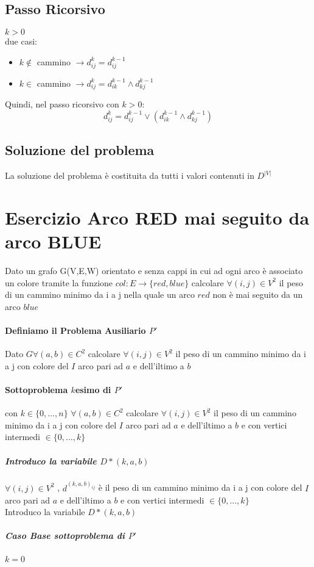 \documentclass[12pt, a4paper, openany]{book}
\begin{document}
    \subsection*{Passo Ricorsivo} $k>0$\\
    due casi:
    \begin{itemize}
        \item $k\notin$ cammino $\rightarrow d^k_{ij} = d^{k-1}_{ij}$
        \item $k \in$ cammino $\rightarrow d^k_{ij} = d^{k-1}_{ik} \land d^{k-1}_{kj}$
    \end{itemize}
    Quindi, nel passo ricorsivo con $k>0$:
    \begin{equation*}
        d^k_{ij} = d^{k-1}_{ij} \lor  (d^{k-1}_{ik} \land d^{k-1}_{kj})
    \end{equation*}

    \subsection*{Soluzione del problema}
    La soluzione del problema è costituita da tutti i valori contenuti in $D^{|V|}$

    \section{Esercizio Arco RED mai seguito da arco BLUE}
    Dato un grafo G(V,E,W) orientato e senza cappi in cui ad ogni arco è associato un colore tramite la funzione $col: E\rightarrow \{red,blue\}$
    calcolare $\forall (i,j) \in V^2$ il peso di un cammino minimo da i a j nella quale un arco $red$ non è mai seguito da un arco $blue$

    \paragraph{Definiamo il Problema Ausiliario $P'$}
    Dato $G \forall(a,b) \in C^2$ calcolare $\forall(i,j) \in V^2$ il peso di un cammino minimo da i a j con
    colore del $I$ arco pari ad $a$ e dell'iltimo a $b$

    \paragraph{Sottoproblema $k$esimo di $P'$} con $k \in \{0,...,n\}$
$\forall(a,b) \in C^2$ calcolare $\forall(i,j) \in V^2$ il peso di un cammino minimo da i a j con
    colore del $I$ arco pari ad $a$ e dell'iltimo a $b$ e con vertici intermedi $\in \{0,...,k\}$\\
    \subparagraph{Introduco la variabile $D*{(k,a,b)}$}
$\forall(i,j)\in V^2$ , $d^{(k,a,b)_{ij}}$ è il peso di un cammino minimo da i a j  con
    colore del $I$ arco pari ad $a$ e dell'iltimo a $b$ e con vertici intermedi $\in \{0,...,k\}$\\
    Introduco la variabile $D*{(k,a,b)}$
    \subparagraph{Caso Base sottoproblema di $P'$} $k = 0$
\end{document}
